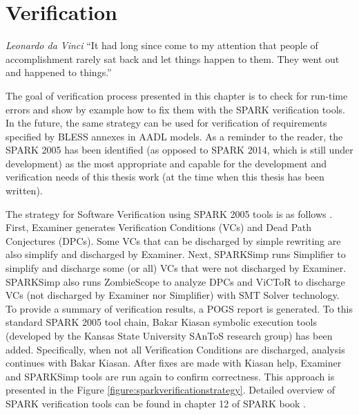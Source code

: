 
\cleardoublepage

\chapter{Verification}
\label{verification}

\begin{chapquote}{\textit{Leonardo da Vinci}}
``It had long since come to my attention that people of accomplishment rarely sat back and let things happen to them. They went out and happened to things.''
\end{chapquote}

The goal of verification process presented in this chapter is to check for run-time errors and show by example how to fix them with the SPARK verification tools. In the future, the same strategy can be used for verification of requirements specified by BLESS annexes in AADL models. As a reminder to the reader, the SPARK 2005 has been identified (as opposed to SPARK 2014, which is still under development) as the most appropriate and capable for the development and verification needs of this thesis work (at the time when this thesis has been written).

The strategy for Software Verification using SPARK 2005 tools is as follows \cite{Barnes:Book}. First, Examiner generates Verification Conditions (VCs) and Dead Path Conjectures (DPCs). Some VCs that can be discharged by simple rewriting are also simplify and discharged by Examiner. Next, SPARKSimp runs Simplifier to simplify and discharge some (or all) VCs that were not discharged by Examiner. SPARKSimp also runs ZombieScope to analyze DPCs and ViCToR to discharge VCs (not discharged by Examiner nor Simplifier) with SMT Solver technology. To provide a summary of verification results, a POGS report is generated. To this standard SPARK 2005 tool chain, Bakar Kiasan symbolic execution tools (developed by the Kansas State University SAnToS research group) has been added. Specifically, when not all Verification Conditions are discharged, analysis continues with Bakar Kiasan. After fixes are made with Kiasan help, Examiner and SPARKSimp tools are run again to confirm correctness. This approach is presented in the Figure \ref{figure:sparkverificationstrategy}. Detailed overview of SPARK verification tools can be found in chapter 12 of SPARK book \cite{Barnes:Book}.

